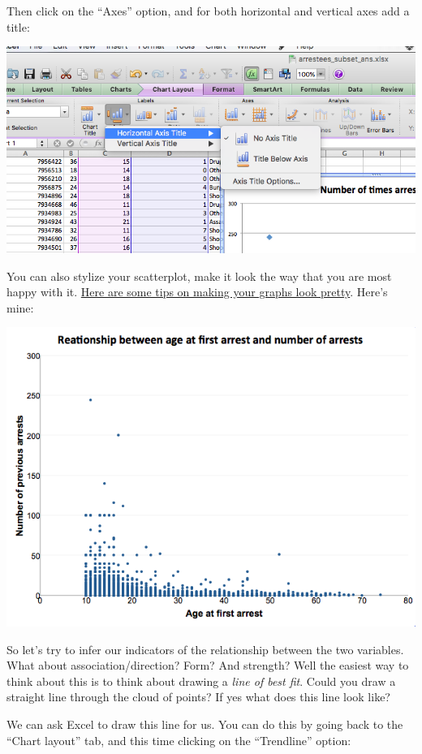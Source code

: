 \documentclass[]{book}
\theoremstyle{definition}
\theoremstyle{definition}
\theoremstyle{definition}
\theoremstyle{remark}
\begin{document}
Then click on the ``Axes'' option, and for both horizontal and vertical
axes add a title:

\includegraphics{imgs/scatter_8.png}

You can also stylize your scatterplot, make it look the way that you are
most happy with it.
\href{http://strategyandanalytics.com/5-steps-creating-beautiful-eye-catching-charts-excel/}{Here
are some tips on making your graphs look pretty}. Here's mine:

\includegraphics{imgs/scatter_9.png}

So let's try to infer our indicators of the relationship between the two
variables. What about association/direction? Form? And strength? Well
the easiest way to think about this is to think about drawing a
\emph{line of best fit}. Could you draw a straight line through the
cloud of points? If yes what does this line look like?

We can ask Excel to draw this line for us. You can do this by going back
to the ``Chart layout'' tab, and this time clicking on the ``Trendline''
option:
\end{document}
